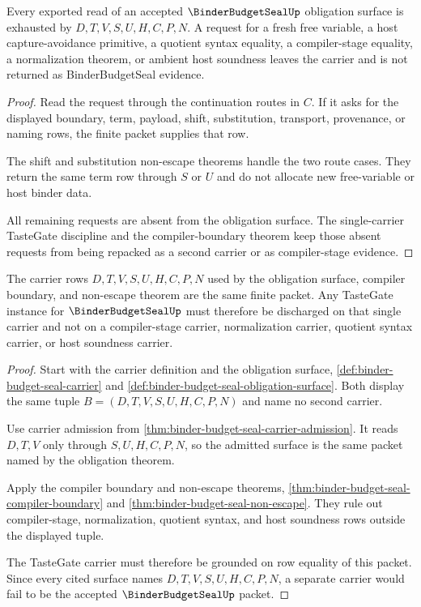 \begin{theorem}
\label{thm:binder-budget-seal-non-escape}
Every exported read of an accepted $\BinderBudgetSealUp$ obligation surface is exhausted by $D,T,V,S,U,H,C,P,N$. A request for a fresh free variable, a host capture-avoidance primitive, a quotient syntax equality, a compiler-stage equality, a normalization theorem, or ambient host soundness leaves the carrier and is not returned as BinderBudgetSeal evidence.
\end{theorem}
\begin{proof}
Read the request through the continuation routes in $C$. If it asks for the displayed boundary, term, payload, shift, substitution, transport, provenance, or naming rows, the finite packet supplies that row.

The shift and substitution non-escape theorems handle the two route cases. They return the same term row through $S$ or $U$ and do not allocate new free-variable or host binder data.

All remaining requests are absent from the obligation surface. The single-carrier TasteGate discipline and the compiler-boundary theorem keep those absent requests from being repacked as a second carrier or as compiler-stage evidence.
\end{proof}

\begin{theorem}
\label{thm:binder-budget-seal-tastegate-carrier-grounding}
The carrier rows $D,T,V,S,U,H,C,P,N$ used by the obligation surface, compiler boundary, and non-escape theorem are the same finite packet. Any TasteGate instance for $\BinderBudgetSealUp$ must therefore be discharged on that single carrier and not on a compiler-stage carrier, normalization carrier, quotient syntax carrier, or host soundness carrier.
\end{theorem}
\begin{proof}
Start with the carrier definition and the obligation surface, \autoref{def:binder-budget-seal-carrier} and \autoref{def:binder-budget-seal-obligation-surface}. Both display the same tuple $B=(D,T,V,S,U,H,C,P,N)$ and name no second carrier.

Use carrier admission from \autoref{thm:binder-budget-seal-carrier-admission}. It reads $D,T,V$ only through $S,U,H,C,P,N$, so the admitted surface is the same packet named by the obligation theorem.

Apply the compiler boundary and non-escape theorems, \autoref{thm:binder-budget-seal-compiler-boundary} and \autoref{thm:binder-budget-seal-non-escape}. They rule out compiler-stage, normalization, quotient syntax, and host soundness rows outside the displayed tuple.

The TasteGate carrier must therefore be grounded on row equality of this packet. Since every cited surface names $D,T,V,S,U,H,C,P,N$, a separate carrier would fail to be the accepted $\BinderBudgetSealUp$ packet.
\end{proof}

